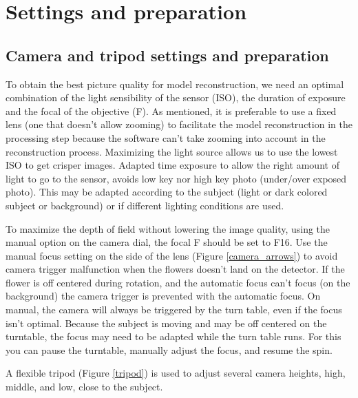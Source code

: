 \documentclass[10pt,letter,english]{article}
\begin{document}
\newpage
\section{Settings and preparation}

\subsection{Camera and tripod settings and preparation}
To obtain the best picture quality for model reconstruction, we need an optimal combination of the light sensibility of the sensor (ISO), the duration of exposure and the focal of the objective (F). As mentioned, it is preferable to use a fixed lens (one that doesn't allow zooming) to facilitate the model reconstruction in the processing step because the software can't take zooming into account in the reconstruction process.
Maximizing the light source allows us to use the lowest ISO to get crisper images. Adapted time exposure to allow the right amount of light to go to the sensor, avoids low key nor high key photo (under/over exposed photo). This may be adapted according to the subject (light or dark colored subject or background) or if different lighting conditions are used.

To maximize the depth of field without lowering the image quality, using the manual option on the camera dial, the focal F should be set to F16. Use the manual focus setting on the side of the lens (Figure \ref{camera_arrows}) to avoid camera trigger malfunction when the flowers doesn't land on the detector. If the flower is off centered during rotation, and the automatic focus can't focus (on the background) the camera trigger is prevented with the automatic focus. On manual, the camera will always be triggered by the turn table, even if the focus isn't optimal. Because the subject is moving and may be off centered on the turntable, the focus may need to be adapted while the turn table runs. For this you can pause the turntable, manually adjust the focus, and resume the spin.


A flexible tripod (Figure \ref{tripod}) is used to adjust several camera heights, high, middle, and low, close to the subject.
\end{document}
